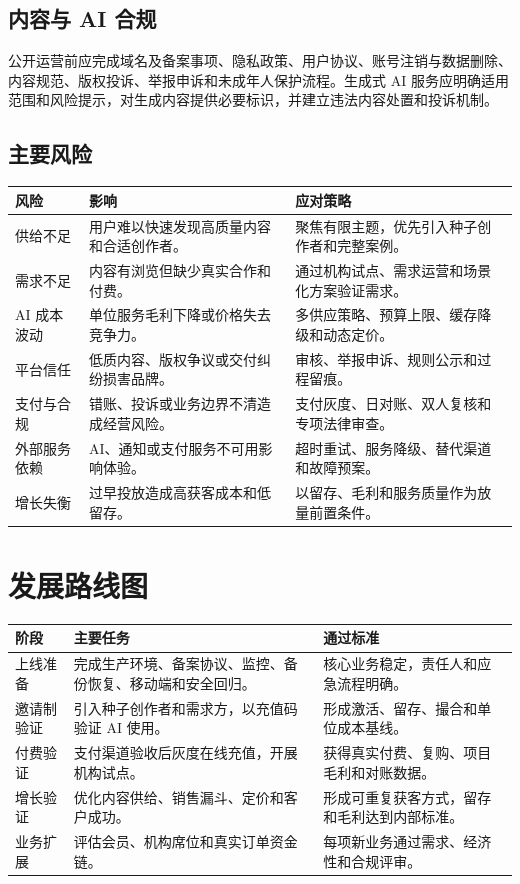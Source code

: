 \documentclass[12pt,a4paper,openany,fontset=fandol]{ctexrep}
\begin{document}
\section{内容与 AI 合规}

公开运营前应完成域名及备案事项、隐私政策、用户协议、账号注销与数据删除、内容规范、版权投诉、举报申诉和未成年人保护流程。生成式 AI 服务应明确适用范围和风险提示，对生成内容提供必要标识，并建立违法内容处置和投诉机制。

\section{主要风险}

\begin{longtable}{p{3cm} p{5.2cm} p{5.4cm}}
\toprule
风险 & 影响 & 应对策略 \\
\midrule
供给不足 & 用户难以快速发现高质量内容和合适创作者。 & 聚焦有限主题，优先引入种子创作者和完整案例。 \\
需求不足 & 内容有浏览但缺少真实合作和付费。 & 通过机构试点、需求运营和场景化方案验证需求。 \\
AI 成本波动 & 单位服务毛利下降或价格失去竞争力。 & 多供应策略、预算上限、缓存降级和动态定价。 \\
平台信任 & 低质内容、版权争议或交付纠纷损害品牌。 & 审核、举报申诉、规则公示和过程留痕。 \\
支付与合规 & 错账、投诉或业务边界不清造成经营风险。 & 支付灰度、日对账、双人复核和专项法律审查。 \\
外部服务依赖 & AI、通知或支付服务不可用影响体验。 & 超时重试、服务降级、替代渠道和故障预案。 \\
增长失衡 & 过早投放造成高获客成本和低留存。 & 以留存、毛利和服务质量作为放量前置条件。 \\
\bottomrule
\end{longtable}

\chapter{发展路线图}

\begin{longtable}{p{2.8cm} p{5.2cm} p{5.6cm}}
\toprule
阶段 & 主要任务 & 通过标准 \\
\midrule
上线准备 & 完成生产环境、备案协议、监控、备份恢复、移动端和安全回归。 & 核心业务稳定，责任人和应急流程明确。 \\
邀请制验证 & {\raggedright 引入种子创作者和需求方，以充值码验证 AI 使用。\par} & 形成激活、留存、撮合和单位成本基线。 \\
付费验证 & 支付渠道验收后灰度在线充值，开展机构试点。 & 获得真实付费、复购、项目毛利和对账数据。 \\
增长验证 & 优化内容供给、销售漏斗、定价和客户成功。 & 形成可重复获客方式，留存和毛利达到内部标准。 \\
业务扩展 & 评估会员、机构席位和真实订单资金链。 & 每项新业务通过需求、经济性和合规评审。 \\
\bottomrule
\end{longtable}
\end{document}
